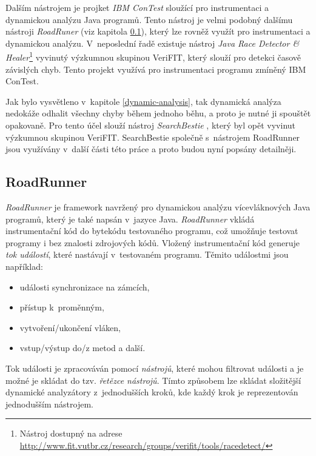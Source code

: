 Dalším nástrojem je projket \textit{IBM ConTest} \cite{cite:IBM} sloužící pro instrumentaci a dynamickou analýzu Java programů. Tento nástroj je velmi podobný dalšímu nástroji \textit{RoadRuner} \cite{cite:rr} (viz kapitola \ref{roadrunner}), který lze rovněž využít pro instrumentaci a dynamickou analýzu. V~neposlední řadě existuje nástroj \textit{Java Race Detector \& Healer}\footnote{Nástroj dostupný na adrese \url{http://www.fit.vutbr.cz/research/groups/verifit/tools/racedetect/}} vyvinutý výzkumnou skupinou VeriFIT, který slouží pro detekci časově závislých chyb. Tento projekt využívá pro instrumentaci programu zmíněný IBM ConTest.

Jak bylo vysvětleno v~kapitole \ref{dynamic-analysis}, tak dynamická analýza nedokáže odhalit všechny chyby během jednoho běhu, a proto je nutné ji spouštět opakovaně. Pro tento účel slouží nástroj \textit{SearchBestie} \cite{cite:sb}, který byl opět vyvinut výzkumnou skupinou VeriFIT. SearchBestie společně s~nástrojem RoadRunner jsou využívány v~další části této práce a proto budou nyní popsány detailněji.

\subsection{RoadRunner}\label{roadrunner}
\textit{RoadRunner} \cite{cite:rr} je framework navržený pro dynamickou analýzu vícevláknových Java programů, který je také napsán v~jazyce Java.
\textit{RoadRunner} vkládá instrumentační kód do bytekódu testovaného programu, což umožňuje testovat programy i bez znalosti zdrojových kódů. Vložený instrumentační kód generuje \textit{tok událostí}, které nastávají v~testovaném programu. Těmito událostmi jsou například:
\begin{itemize}
\item události synchronizace na zámcích,
\item přístup k~proměnným,
\item vytvoření/ukončení vláken,
\item vstup/výstup do/z metod a další.
\end{itemize}

Tok události je zpracováván pomocí \textit{nástrojů}, které mohou filtrovat události a je možné je skládat do tzv. \textit{řetězce nástrojů}. Tímto způsobem lze skládat složitější dynamické analyzátory z~jednodušších kroků, kde každý krok je reprezentován jednodušším nástrojem.


